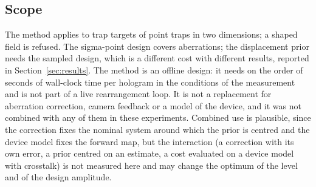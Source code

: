 \subsection{Scope}

The method applies to trap targets of point traps in two dimensions; a shaped field is refused. The sigma-point design covers aberrations; the displacement prior needs the sampled design, which is a different cost with different results, reported in Section~\ref{sec:results}. The method is an offline design: it needs on the order of \runSeconds{} seconds of wall-clock time per hologram in the conditions of the measurement and is not part of a live rearrangement loop. It is not a replacement for aberration correction, camera feedback or a model of the device, and it was not combined with any of them in these experiments. Combined use is plausible, since the correction fixes the nominal system around which the prior is centred and the device model fixes the forward map, but the interaction (a correction with its own error, a prior centred on an estimate, a cost evaluated on a device model with crosstalk) is not measured here and may change the optimum of the level and of the design amplitude.
